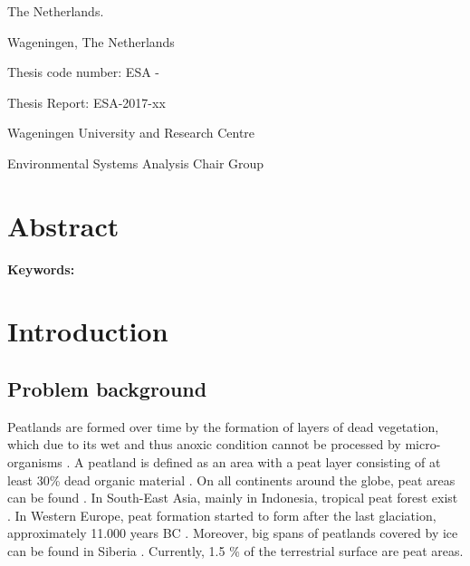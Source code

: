 \documentclass[a4paper,12pt]{scrbook}
\begin{document}
\begin{titlingpage}
\begin{center}
  {The Netherlands.}\vspace{2.7cm}
  \end{center}
  
  \begin{flushright}
    {\thedate}
  
    {Wageningen, The Netherlands}
  \end{flushright}\vspace{0.5cm}

    Thesis code number: ESA -
  
    Thesis Report: ESA-2017-xx
  
    {Wageningen University and Research Centre}
  
    {Environmental Systems Analysis Chair Group}
\end{titlingpage}


\chapter*{Abstract}

\textbf{Keywords:} 

\tableofcontents

\chapter{Introduction}

\section{Problem background}

Peatlands are formed over time by the formation of layers of dead vegetation, which due to its wet and thus anoxic condition cannot be processed by micro-organisms \citep{clymo1984limits}. A peatland is defined as an area with a peat layer consisting of at least 30\% dead organic material \citep{joosten2002wise}. On all continents around the globe, peat areas can be found \citep{joosten2002wise}. In South-East Asia, mainly in Indonesia, tropical peat forest exist \citep{page2011global}. In Western Europe, peat formation started to form after the last glaciation, approximately 11.000 years BC \citep{brouns2016effects}. Moreover, big spans of peatlands covered by ice can be found in Siberia \citep{frey2005amplified}. Currently, 1.5 \% of the terrestrial surface are peat areas.
\end{document}
